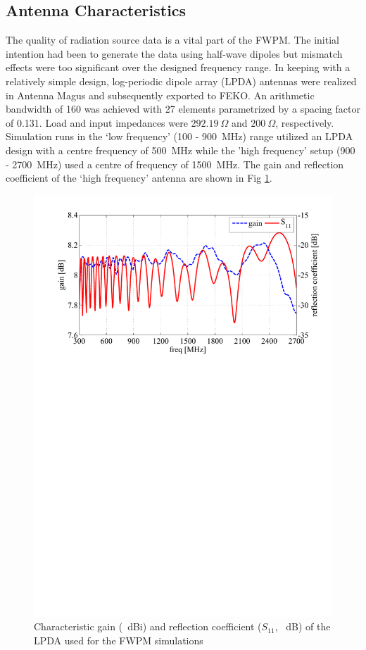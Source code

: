 \documentclass[10pt,journal,twoside]{IEEEtran}
\begin{document}
\subsection{Antenna Characteristics}
The quality of radiation source data is a vital part of the FWPM. The initial intention had been to generate the data using half-wave dipoles but mismatch effects were too significant over the designed frequency range. In keeping with a relatively simple design, log-periodic dipole array (LPDA) antennas were realized in Antenna Magus and subsequently exported to FEKO. An arithmetic bandwidth of \num{160} was achieved with \num{27} elements parametrized by a spacing factor of \num{0.131}. Load and input impedances were $\SI{292.19}{\Omega}$ and $\SI{200}{\Omega}$, respectively. Simulation runs in the `low frequency' (\SI{100}{} - \SI{900}{MHz}) range utilized an LPDA design with a centre frequency of \SI{500}{MHz} while the 'high frequency' setup (\SI{900}{} - \SI{2700}{MHz}) used a centre of frequency of \SI{1500}{MHz}. The gain and reflection coefficient of the `high frequency' antenna are shown in  Fig \ref{fig:gain_s11}.   %
\begin{figure}%
	\centering
	\includegraphics[width=\linewidth]{antenna_gain_s11}%
	\caption{Characteristic gain (\SI{}{dBi}) and reflection coefficient ($S_{11}$, \SI{}{dB}) of the LPDA used for the FWPM simulations}%
	\label{fig:gain_s11}%
\end{figure}%
%
\end{document}

